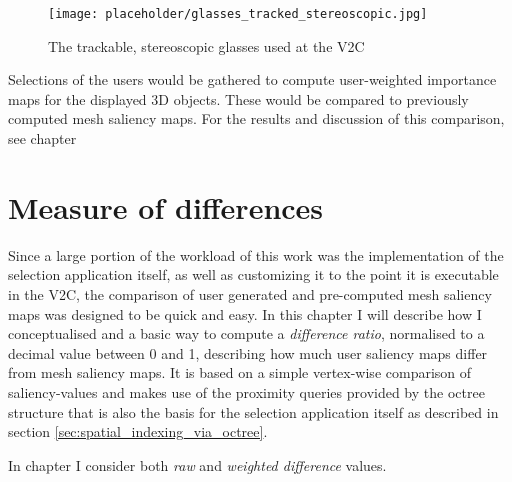 \begin{figure}[htb]
  \centering
  \texttt{[image: placeholder/glasses\_tracked\_stereoscopic.jpg]}\\ %
  \caption{The trackable, stereoscopic glasses used at the V2C}\label{fig:glasses}
\end{figure}

Selections of the users would be gathered to compute user-weighted importance maps for the displayed 3D objects. These would be compared to previously computed mesh saliency maps. For the results and discussion of this comparison, see chapter 

	\section {Measure of differences}
	\label{sec:measure_of_difference}
Since a large portion of the workload of this work was the implementation of the selection application itself, as well as customizing it to the point it is executable in the V2C, the comparison of user generated and pre-computed mesh saliency maps was designed to be quick and easy. In this chapter I will describe how I conceptualised and a basic way to compute a \textit{difference ratio}, normalised to a decimal value between 0 and 1, describing how much user saliency maps differ from mesh saliency maps. It is based on a simple vertex-wise comparison of saliency-values and makes use of the proximity queries provided by the octree structure that is also the basis for the selection application itself as described in section \ref{sec:spatial_indexing_via_octree}.

In chapter %
I consider both \textit{raw} and \textit{weighted difference} values.

